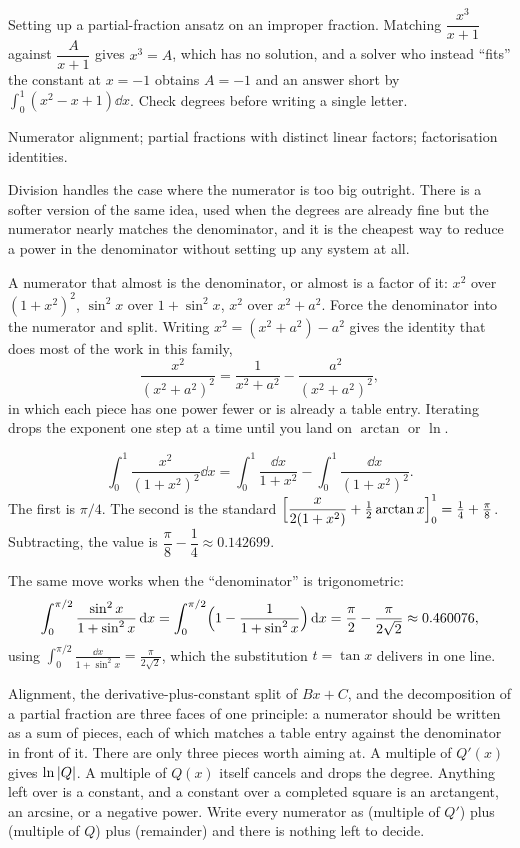 \begin{trap}
Setting up a partial-fraction ansatz on an improper fraction. Matching $\dfrac{x^3}{x+1}$ against $\dfrac{A}{x+1}$ gives $x^3=A$, which has no solution, and a solver who instead ``fits'' the constant at $x=-1$ obtains $A=-1$ and an answer short by $\int_0^1(x^2-x+1)\dd x$. Check degrees before writing a single letter.
\end{trap}

\begin{seealsob}Numerator alignment; partial fractions with distinct linear factors; factorisation identities.\end{seealsob}

Division handles the case where the numerator is too big outright. There is a softer version of the same idea, used when the degrees are already fine but the numerator nearly matches the denominator, and it is the cheapest way to reduce a power in the denominator without setting up any system at all.

\cue A numerator that almost is the denominator, or almost is a factor of it: $x^2$ over $(1+x^2)^2$, $\sin^2x$ over $1+\sin^2x$, $x^2$ over $x^2+a^2$.
\method Force the denominator into the numerator and split. Writing $x^2=(x^2+a^2)-a^2$ gives the identity that does most of the work in this family,
\[
\frac{x^2}{(x^2+a^2)^2}=\frac{1}{x^2+a^2}-\frac{a^2}{(x^2+a^2)^2},
\]
in which each piece has one power fewer or is already a table entry. Iterating drops the exponent one step at a time until you land on $\arctan$ or $\ln$.

\begin{worked}
\[
\int_0^1\frac{x^2}{(1+x^2)^2}\dd x=\int_0^1\frac{\dd x}{1+x^2}-\int_0^1\frac{\dd x}{(1+x^2)^2}.
\]
The first is $\pi/4$. The second is the standard $\Bigl[\dfrac{x}{2(1+x^2)}+\tfrac12\arctan x\Bigr]_0^1=\tfrac14+\tfrac{\pi}{8}$. Subtracting, the value is $\dfrac{\pi}{8}-\dfrac14\approx0.142699$.

The same move works when the ``denominator'' is trigonometric:
\[
\int_0^{\pi/2}\frac{\sin^2x}{1+\sin^2x}\,\mathrm{d} x=\int_0^{\pi/2}\Bigl(1-\frac{1}{1+\sin^2x}\Bigr)\,\mathrm{d} x=\frac{\pi}{2}-\frac{\pi}{2\sqrt2}\approx0.460076 ,
\]
using $\displaystyle\int_0^{\pi/2}\frac{\dd x}{1+\sin^2x}=\frac{\pi}{2\sqrt2}$, which the substitution $t=\tan x$ delivers in one line.
\end{worked}

\begin{keynote}
Alignment, the derivative-plus-constant split of $Bx+C$, and the decomposition of a partial fraction are three faces of one principle: a numerator should be written as a sum of pieces, each of which matches a table entry against the denominator in front of it. There are only three pieces worth aiming at. A multiple of $Q'(x)$ gives $\ln\left\lvert Q\right\rvert$. A multiple of $Q(x)$ itself cancels and drops the degree. Anything left over is a constant, and a constant over a completed square is an arctangent, an arcsine, or a negative power. Write every numerator as (multiple of $Q'$) plus (multiple of $Q$) plus (remainder) and there is nothing left to decide.
\end{keynote}

